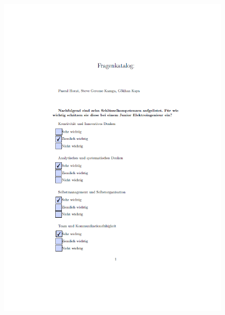  
\begin{figure}[ht]
	\centering
 	\includegraphics[width=1.3\textwidth]{images/Tiwe1.png}
 	\label{fig:fragtiw1}
\end{figure}

